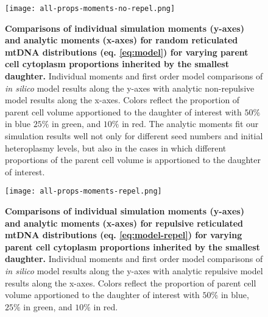 \documentclass{article}
\begin{document}
\begin{appendices}
\begin{figure}[!ht]
\end{figure}
\begin{figure}
        \centering \texttt{[image: all-props-moments-no-repel.png]}
        \caption{\textbf{Comparisons of individual simulation moments (y-axes) and analytic moments (x-axes) for random reticulated mtDNA distributions (eq. \ref{eq:model}) for varying parent cell cytoplasm proportions inherited by the smallest daughter.} Individual moments and first order model comparisons of \textit{in silico} model results along the y-axes with analytic non-repulsive model results along the x-axes. Colors reflect the proportion of parent cell volume apportioned to the daughter of interest with $50\%$ in blue $25\%$ in green, and $10\%$ in red. The analytic moments fit our simulation results well not only for different seed numbers and initial heteroplasmy levels, but also in the cases in which different proportions of the parent cell volume is apportioned to the daughter of interest.
        }\label{fig:app-moments}
\end{figure}
\begin{figure}
        \centering \texttt{[image: all-props-moments-repel.png]}
        \caption{\textbf{Comparisons of individual simulation moments (y-axes) and analytic moments (x-axes) for repulsive reticulated mtDNA distributions (eq. \ref{eq:model-repel}) for varying parent cell cytoplasm proportions inherited by the smallest daughter.} Individual moments and first order model comparisons of \textit{in silico} model results along the y-axes with analytic repulsive model results along the x-axes. Colors reflect the proportion of parent cell volume apportioned to the daughter of interest with $50\%$ in blue, $25\%$ in green, and $10\%$ in red.
        }\label{fig:app-moments-repel}
\end{figure}
\end{appendices}
\end{document}
